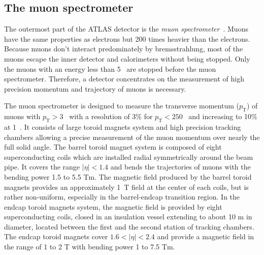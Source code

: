 
\subsection{The muon spectrometer}
\label{subsec:ae_the_muon_spectrometer}
The outermost part of the ATLAS detector is the \textit{muon spectrometer}~\cite{Aad:2008zzm, Palestini:2003dm, Diehl:2009bw}.
Muons have the same properties as electrons but 200 times heavier than the electrons.
Because muons don't interact predominately by bremsstrahlung, most of the muons escape the inner detector and calorimeters without being stopped.
Only the muons with an energy less than 5~{\GeV} are stopped before the muon spectrometer.
Therefore, a detector concentrates on the measurement of high precision momentum and trajectory of muons is necessary.

The muon spectrometer is designed to measure the transverse momentum ($p_{\mathrm{T}}$) of muons with $p_{\mathrm{T}} > 3$~{\GeV} with a resolution of 3\% for $p_{\mathrm{T}} < 250$~{\GeV} and increasing to 10\% at 1~{\TeV}.
It consists of large toroid magnets system and high precision tracking chambers allowing a precise measurement of the muon momentum over nearly the full solid angle.
The barrel toroid magnet system is composed of eight superconducting coils which are installed radial symmetrically around the beam pipe.
It covers the range $|\eta| < 1.4$ and bends the trajectories of muons with the bending power 1.5 to 5.5 Tm.
The magnetic field produced by the barrel toroid magnets provides an approximately 1~T field at the center of each coils, but is rather non-uniform, especially in the barrel-endcap transition region.
In the endcap toroid magnets system, the magnetic field is provided by eight superconducting coils, closed in an insulation vessel extending to about 10 m in diameter, located between the first and the second station of tracking chambers.
The endcap toroid magnets cover $1.6 < |\eta| < 2.4$ and provide a magnetic field in the range of 1 to 2 T with bending power 1 to 7.5 Tm.


